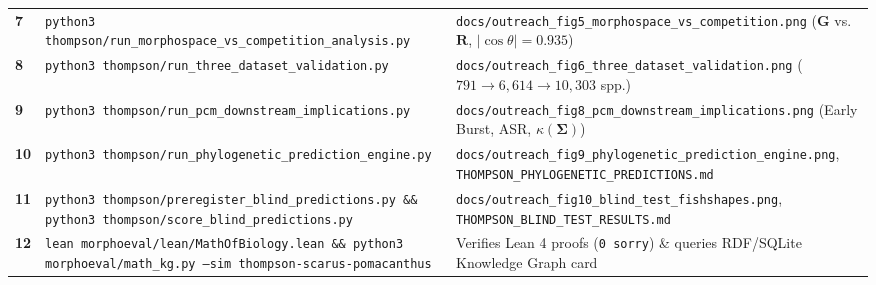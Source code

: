 \documentclass[10pt,a4paper]{article}
\begin{document}
\begin{table}[h!]
\begin{tabular}{@{}p{}p{}p{}@{}}
\rowcolor{softgray}
\textbf{7} & \texttt{python3 thompson/run\_morphospace\_vs\_competition\_analysis.py} & \texttt{docs/outreach\_fig5\_morphospace\_vs\_competition.png} ($\mathbf{G}$ vs.\ $\mathbf{R}$, $|\cos\theta|=0.935$) \\
\textbf{8} & \texttt{python3 thompson/run\_three\_dataset\_validation.py} & \texttt{docs/outreach\_fig6\_three\_dataset\_validation.png} ($791 \to 6{,}614 \to 10{,}303$ spp.) \\
\rowcolor{softgray}
\textbf{9} & \texttt{python3 thompson/run\_pcm\_downstream\_implications.py} & \texttt{docs/outreach\_fig8\_pcm\_downstream\_implications.png} (Early Burst, ASR, $\kappa(\mathbf{\Sigma})$) \\
\textbf{10} & \texttt{python3 thompson/run\_phylogenetic\_prediction\_engine.py} & \texttt{docs/outreach\_fig9\_phylogenetic\_prediction\_engine.png}, \texttt{THOMPSON\_PHYLOGENETIC\_PREDICTIONS.md} \\
\rowcolor{softgray}
\textbf{11} & \texttt{python3 thompson/preregister\_blind\_predictions.py \&\& python3 thompson/score\_blind\_predictions.py} & \texttt{docs/outreach\_fig10\_blind\_test\_fishshapes.png}, \texttt{THOMPSON\_BLIND\_TEST\_RESULTS.md} \\
\textbf{12} & \texttt{lean morphoeval/lean/MathOfBiology.lean \&\& python3 morphoeval/math\_kg.py --sim thompson-scarus-pomacanthus} & Verifies Lean 4 proofs (\texttt{0 sorry}) \& queries RDF/SQLite Knowledge Graph card \\
\bottomrule
\end{tabular}
\end{table}
\end{document}
